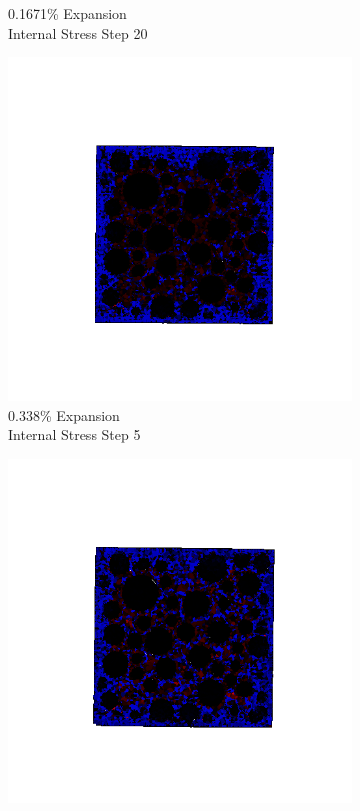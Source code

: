 \begin{figure}[ht!]
\begin{subfigure}{.25\textwidth}
      \caption{0.1671\% Expansion\\Internal Stress Step 20}
    \end{subfigure}
    \begin{subfigure}{.25\textwidth}
      \centering
      \includegraphics[width=1.0\linewidth]{Files/exp_3D/DEF/A30X-5C_2_s5.png}
      \caption{0.338\% Expansion\\Internal Stress Step 5}
    \end{subfigure}%
    \begin{subfigure}{.25\textwidth}
      \centering
      \includegraphics[width=1.0\linewidth]{Files/exp_3D/DEF/A30X-5C_2_s10.png}

\end{subfigure}
\end{figure}
